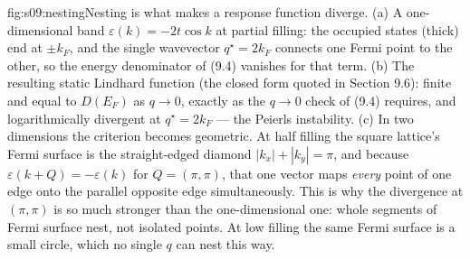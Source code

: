 %
\begin{aqmfigure}{fig:s09:nesting}{Nesting is what makes a response function diverge.
(a) A one-dimensional band $\varepsilon(k)=-2t\cos k$ at partial filling: the occupied states (thick)
end at $\pm k_F$, and the single wavevector $q^\star=2k_F$ connects one Fermi point to the other, so
the energy denominator of (9.4) vanishes for that term. (b) The resulting static Lindhard function
(the closed form quoted in Section 9.6): finite and equal to $D(E_F)$ as $q\to0$, exactly as the
$q\to0$ check of (9.4) requires, and logarithmically divergent at $q^\star=2k_F$ --- the Peierls
instability. (c) In two dimensions the criterion becomes geometric. At half filling the square
lattice's Fermi surface is the straight-edged diamond $|k_x|+|k_y|=\pi$, and because
$\varepsilon(k+Q)=-\varepsilon(k)$ for $Q=(\pi,\pi)$, that one vector maps \emph{every} point of one
edge onto the parallel opposite edge simultaneously. This is why the divergence at $(\pi,\pi)$ is so
much stronger than the one-dimensional one: whole segments of Fermi surface nest, not isolated
points. At low filling the same Fermi surface is a small circle, which no single $q$ can nest this
way.}

\begin{tikzpicture}


\end{tikzpicture}
\end{aqmfigure}
